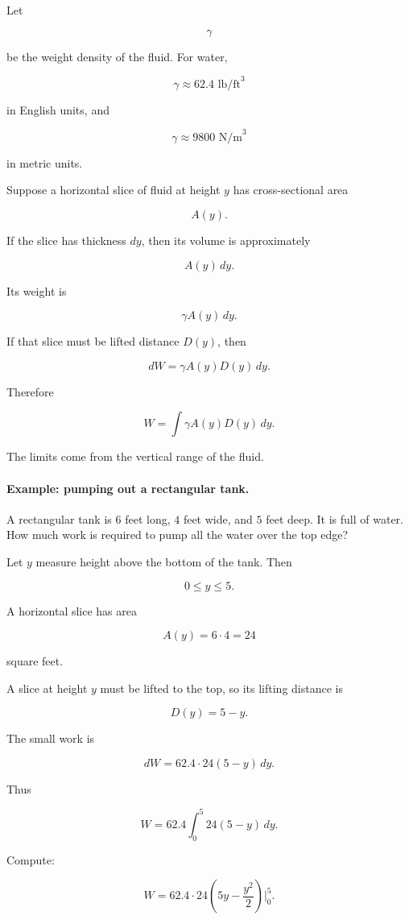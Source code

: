 Let

\[
\gamma
\]

be the weight density of the fluid.  For water,

\[
\gamma\approx62.4\text{ lb/ft}^3
\]

in English units, and

\[
\gamma\approx9800\text{ N/m}^3
\]

in metric units.

Suppose a horizontal slice of fluid at height \(y\) has cross-sectional area

\[
A(y).
\]

If the slice has thickness \(dy\), then its volume is approximately

\[
A(y)\,dy.
\]

Its weight is

\[
\gamma A(y)\,dy.
\]

If that slice must be lifted distance \(D(y)\), then

\[
dW=\gamma A(y)D(y)\,dy.
\]

Therefore

\[
\boxed{
W=\int \gamma A(y)D(y)\,dy.
}
\]

The limits come from the vertical range of the fluid.

\paragraph{Example: pumping out a rectangular tank.}
A rectangular tank is \(6\) feet long, \(4\) feet wide, and \(5\) feet deep.  It is full of
water.  How much work is required to pump all the water over the top edge?

Let \(y\) measure height above the bottom of the tank.  Then

\[
0\le y\le5.
\]

A horizontal slice has area

\[
A(y)=6\cdot4=24
\]

square feet.

A slice at height \(y\) must be lifted to the top, so its lifting distance is

\[
D(y)=5-y.
\]

The small work is

\[
dW=62.4\cdot24(5-y)\,dy.
\]

Thus

\[
W=62.4\int_0^5 24(5-y)\,dy.
\]

Compute:

\[
W=62.4\cdot24\left(5y-\frac{y^2}{2}\right)\Big|_0^5.
\]

